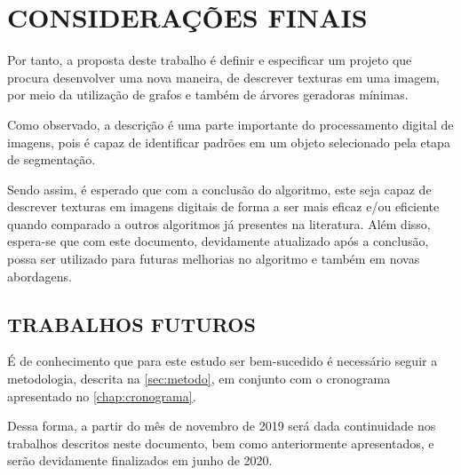 
\chapter{CONSIDERAÇÕES FINAIS}
\label{chap:consideracoesFinais}

\par Por tanto, a proposta deste trabalho é definir e especificar um projeto que procura desenvolver uma nova maneira, de descrever texturas em uma imagem, por meio da utilização de grafos e também de árvores geradoras mínimas.
\par Como observado, a descrição é uma parte importante do processamento digital de imagens, pois é capaz de identificar padrões em um objeto selecionado pela etapa de segmentação.
\par Sendo assim, é esperado que com a conclusão do algoritmo, este seja capaz de descrever texturas em imagens digitais de forma a ser mais eficaz e/ou eficiente quando comparado a outros algoritmos já presentes na literatura. Além disso, espera-se que com este documento, devidamente atualizado após a conclusão, possa ser utilizado para futuras melhorias no algoritmo e também em novas abordagens.

\section{TRABALHOS FUTUROS}
\label{sec:trabalhos-futuros}

\par É de conhecimento que para este estudo ser bem-sucedido é necessário seguir a metodologia, descrita na \autoref{sec:metodo}, em conjunto com o cronograma apresentado no \autoref{chap:cronograma}.
\par Dessa forma, a partir do mês de novembro de 2019 será dada continuidade nos trabalhos descritos neste documento, bem como anteriormente apresentados, e serão devidamente finalizados em junho de 2020.
